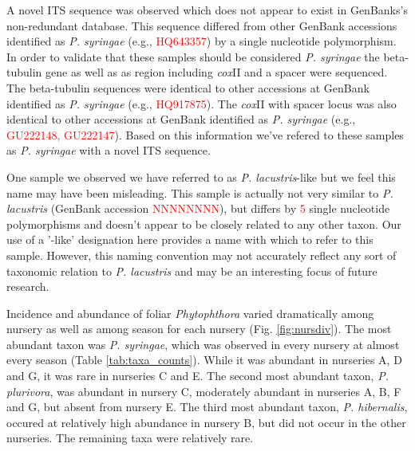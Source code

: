 \documentclass[12pt]{article}
\begin{document}




A novel ITS sequence was observed which does not appear to exist in GenBanks's non-redundant database.  This sequence differed from other GenBank accessions identified as \emph{P. syringae} (e.g., \textcolor{red}{HQ643357}) by a single nucleotide polymorphism.  In order to validate that these samples should be considered \emph{P. syringae} the beta-tubulin gene as well as as region including \emph{cox}II and a spacer were sequenced.  The beta-tubulin sequences were identical to other accessions at GenBank identified as \emph{P. syringae} (e.g., \textcolor{red}{HQ917875}).  The \emph{cox}II with spacer locus was also identical to other accessions at GenBank identified as \emph{P. syringae} (e.g., \textcolor{red}{GU222148, GU222147}).  Based on this information we've refered to these samples as \emph{P. syringae} with a novel ITS sequence.

One sample we observed we have referred to as \emph{P. lacustris}-like but we feel this name may have been misleading.  This sample is actually not very similar to \emph{P. lacustris} (GenBank accession \textcolor{red}{NNNNNNNN}), but differs by \textcolor{red}{5} single nucleotide polymorphisms and doesn't appear to be closely related to any other taxon.  Our use of a '-like' designation here provides a name with which to refer to this sample.  However, this naming convention may not accurately reflect any sort of taxonomic relation to \emph{P. lacustris} and may be an interesting focus of future research.







Incidence and abundance of foliar \emph{Phytophthora} varied dramatically among nursery as well as among season for each nursery (Fig. \ref{fig:nursdiv}).  The most abundant taxon was \emph{P. syringae}, which was observed in every nursery at almost every season (Table \ref{tab:taxa_counts}).  While it was abundant in nurseries A, D and G, it was rare in nurseries C and E.  The second most abundant taxon, \emph{P. plurivora}, was abundant in nursery C, moderately abundant in nurseries A, B, F and G, but absent from nursery E.  The third most abundant taxon, \emph{P. hibernalis}, occured at relatively high abundance in nursery B, but did not occur in the other nurseries.  The remaining taxa were relatively rare.
\end{document}
